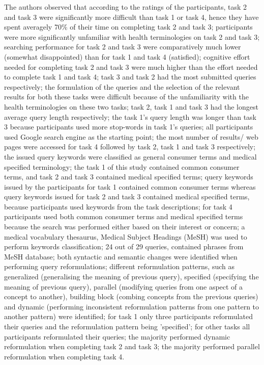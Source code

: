 \documentclass[]{article}
\begin{document}
The authors observed that according to the ratings of the participants, task 2 and task 3 were significantly more difficult than task 1 or task 4, hence they have spent averagely 70\% of their time on completing task 2 and task 3; participants were more significantly unfamiliar with health terminologies on task 2 and task 3; searching performance for task 2 and task 3 were comparatively much lower (somewhat disappointed) than for task 1 and task 4 (satisfied); cognitive effort needed for completing task 2 and task 3 were much higher than the effort needed to complete task 1 and task 4; task 3 and task 2 had the most submitted queries respectively; the formulation of the queries and the selection of the relevant results for both these tasks were difficult because of the unfamiliarity with the health terminologies on these two tasks; task 2, task 1 and task 3 had the longest average query length respectively; the task 1's query length was longer than task 3 because participants used more stop-words in task 1's queries; all participants used Google search engine as the starting point; the most number of results/ web pages were accessed for task 4 followed by task 2, task 1 and task 3 respectively; the issued query keywords were classified as general consumer terms and medical specified terminology; the task 1 of this study contained common consumer terms, and task 2 and task 3 contained medical specified terms; query keywords issued  by the participants for task 1 contained common consumer terms whereas query keywords issued for task 2 and task 3 contained medical specified terms, because participants used keywords from the task descriptions; for task 4 participants used both common consumer terms and medical specified terms because the search was performed either based on their interest or concern; a medical vocabulary thesaurus, Medical Subject Headings (MeSH) was used to perform keywords classification; 24 out of 29 queries, contained phrases from MeSH database; both syntactic and semantic changes were identified when performing query reformulations; different reformulation patterns, such as generalized (generalising the meaning of previous query), specified (specifying the meaning of previous query), parallel (modifying queries from one aspect of a concept to another), building block (combing concepts from the previous queries) and dynamic (performing inconsistent reformulation patterns from one pattern to another pattern) were identified; for task 1 only three participants reformulated their queries and the reformulation pattern being 'specified'; for other tasks all participants reformulated their queries; the majority performed dynamic reformulation when completing task 2 and task 3; the majority performed parallel reformulation when completing task 4. 
\end{document}
